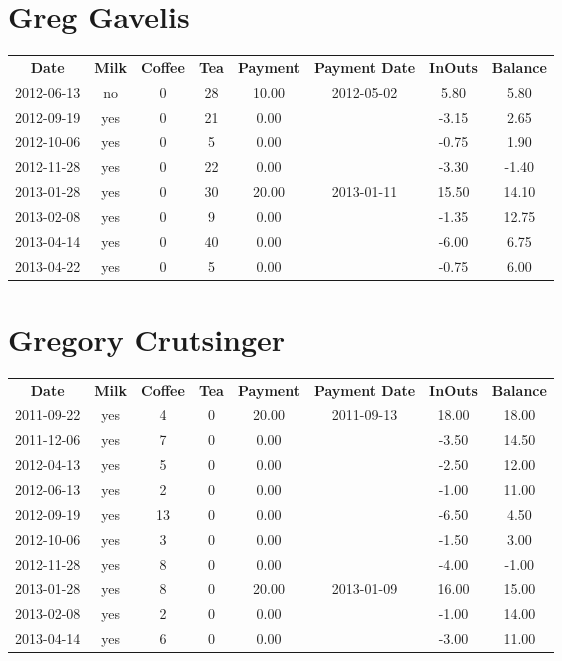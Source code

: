 \section{Greg Gavelis}

\begin{center}
\begin{tabular}{cccccccc}
\textbf{Date} & \textbf{Milk} & \textbf{Coffee} & \textbf{Tea} & \textbf{Payment} & \textbf{Payment Date} & \textbf{InOuts} & \textbf{Balance} \\
2012-06-13 & no & 0 & 28 & 10.00 & 2012-05-02 &  5.80 &  5.80\\ 
2012-09-19 & yes & 0 & 21 &  0.00 &  & -3.15 &  2.65\\ 
2012-10-06 & yes & 0 &  5 &  0.00 &  & -0.75 &  1.90\\ 
2012-11-28 & yes & 0 & 22 &  0.00 &  & -3.30 & -1.40\\ 
2013-01-28 & yes & 0 & 30 & 20.00 & 2013-01-11 & 15.50 & 14.10\\ 
2013-02-08 & yes & 0 &  9 &  0.00 &  & -1.35 & 12.75\\ 
2013-04-14 & yes & 0 & 40 &  0.00 &  & -6.00 &  6.75\\ 
2013-04-22 & yes & 0 &  5 &  0.00 &  & -0.75 &  6.00
\end{tabular}
\end{center}

\section{Gregory Crutsinger}

\begin{center}
\begin{tabular}{cccccccc}
\textbf{Date} & \textbf{Milk} & \textbf{Coffee} & \textbf{Tea} & \textbf{Payment} & \textbf{Payment Date} & \textbf{InOuts} & \textbf{Balance} \\
2011-09-22 & yes &  4 & 0 & 20.00 & 2011-09-13 & 18.00 & 18.00\\ 
2011-12-06 & yes &  7 & 0 &  0.00 &  & -3.50 & 14.50\\ 
2012-04-13 & yes &  5 & 0 &  0.00 &  & -2.50 & 12.00\\ 
2012-06-13 & yes &  2 & 0 &  0.00 &  & -1.00 & 11.00\\ 
2012-09-19 & yes & 13 & 0 &  0.00 &  & -6.50 &  4.50\\ 
2012-10-06 & yes &  3 & 0 &  0.00 &  & -1.50 &  3.00\\ 
2012-11-28 & yes &  8 & 0 &  0.00 &  & -4.00 & -1.00\\ 
2013-01-28 & yes &  8 & 0 & 20.00 & 2013-01-09 & 16.00 & 15.00\\ 
2013-02-08 & yes &  2 & 0 &  0.00 &  & -1.00 & 14.00\\ 
2013-04-14 & yes &  6 & 0 &  0.00 &  & -3.00 & 11.00
\end{tabular}
\end{center}

